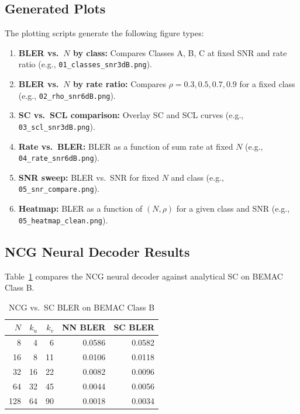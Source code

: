 \documentclass[11pt,a4paper]{article}
\begin{document}
\subsection{Generated Plots}

The plotting scripts generate the following figure types:
\begin{enumerate}
  \item \textbf{BLER vs.\ $N$ by class:} Compares Classes A, B, C at fixed
        SNR and rate ratio (e.g., \texttt{01\_classes\_snr3dB.png}).
  \item \textbf{BLER vs.\ $N$ by rate ratio:} Compares $\rho = 0.3, 0.5, 0.7, 0.9$
        for a fixed class (e.g., \texttt{02\_rho\_snr6dB.png}).
  \item \textbf{SC vs.\ SCL comparison:} Overlay SC and SCL curves
        (e.g., \texttt{03\_scl\_snr3dB.png}).
  \item \textbf{Rate vs.\ BLER:} BLER as a function of sum rate at fixed $N$
        (e.g., \texttt{04\_rate\_snr6dB.png}).
  \item \textbf{SNR sweep:} BLER vs.\ SNR for fixed $N$ and class
        (e.g., \texttt{05\_snr\_compare.png}).
  \item \textbf{Heatmap:} BLER as a function of $(N, \rho)$ for a given
        class and SNR (e.g., \texttt{05\_heatmap\_clean.png}).
\end{enumerate}

\subsection{NCG Neural Decoder Results}

Table~\ref{tab:ncg_vs_sc} compares the NCG neural decoder against analytical
SC on BEMAC Class B.

\begin{table}[h]
\centering
\caption{NCG vs.\ SC BLER on BEMAC Class B}
\label{tab:ncg_vs_sc}
\begin{tabular}{rrrrr}
\toprule
$N$ & $k_u$ & $k_v$ & NN BLER & SC BLER \\
\midrule
   8 &  4 &  6 & 0.0586 & 0.0582 \\
  16 &  8 & 11 & 0.0106 & 0.0118 \\
  32 & 16 & 22 & 0.0082 & 0.0096 \\
  64 & 32 & 45 & 0.0044 & 0.0056 \\
 128 & 64 & 90 & 0.0018 & 0.0034 \\
\bottomrule
\end{tabular}
\end{table}
\end{document}
